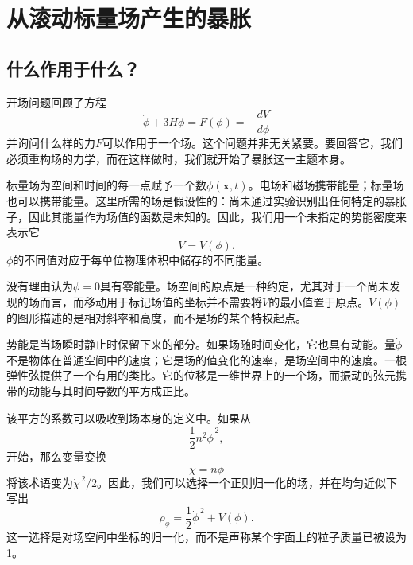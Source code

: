 \chapter{从滚动标量场产生的暴胀}


\section{什么作用于什么？}

开场问题回顾了方程
\begin{equation}
\ddot\phi+3H\dot\phi
=F(\phi)
=-\frac{dV}{d\phi}
\label{eq:c09-opening}
\end{equation}
并询问什么样的力\(F\)可以作用于一个场。这个问题并非无关紧要。要回答它，我们必须重构场的力学，而在这样做时，我们就开始了暴胀这一主题本身。

标量场为空间和时间的每一点赋予一个数\(\phi(\mathbf x,t)\)。电场和磁场携带能量；标量场也可以携带能量。这里所需的场是假设性的：尚未通过实验识别出任何特定的暴胀子，因此其能量作为场值的函数是未知的。因此，我们用一个未指定的势能密度来表示它
\begin{equation}
V=V(\phi).
\label{eq:c09-potential}
\end{equation}
\(\phi\)的不同值对应于每单位物理体积中储存的不同能量。

没有理由认为\(\phi=0\)具有零能量。场空间的原点是一种约定，尤其对于一个尚未发现的场而言，而移动用于标记场值的坐标并不需要将\(V\)的最小值置于原点。\(V(\phi)\)的图形描述的是相对斜率和高度，而不是场的某个特权起点。

势能是当场瞬时静止时保留下来的部分。如果场随时间变化，它也具有动能。量\(\dot\phi\)不是物体在普通空间中的速度；它是场的值变化的速率，是场空间中的速度。一根弹性弦提供了一个有用的类比。它的位移是一维世界上的一个场，而振动的弦元携带的动能与其时间导数的平方成正比。

该平方的系数可以吸收到场本身的定义中。如果从
\begin{equation}
\frac12 n^2\dot\phi^{\,2},
\end{equation}
开始，那么变量变换
\begin{equation}
\chi=n\phi
\end{equation}
将该术语变为\(\dot\chi^{\,2}/2\)。因此，我们可以选择一个正则归一化的场，并在均匀近似下写出
\begin{equation}
\rho_\phi=\frac12\dot\phi^{\,2}+V(\phi).
\label{eq:c09-rho-homogeneous}
\end{equation}
这一选择是对场空间中坐标的归一化，而不是声称某个字面上的粒子质量已被设为1。

